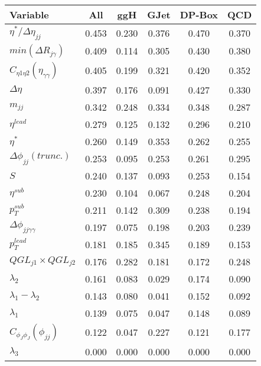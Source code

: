\documentclass[a4paper,portrait]{article}
\begin{document}
\begin{center}
\begin{tabular}{| l || c | c | c | c | c |}
\hline
Variable & All & ggH & GJet & DP-Box & QCD \\ \hline
\rowcolor{Salmon}
$\eta^{*}/\Delta\eta_{jj}$ & 0.453 & 0.230 & 0.376 & 0.470 & 0.370 \\ 
$min(\Delta{R}_{j\gamma})$ & 0.409 & 0.114 & 0.305 & 0.430 & 0.380 \\ 
\rowcolor{Salmon}
$C_{\eta1\eta2}(\eta_{\gamma\gamma})$ & 0.405 & 0.199 & 0.321 & 0.420 & 0.352 \\ 
$\Delta\eta$ & 0.397 & 0.176 & 0.091 & 0.427 & 0.330 \\ 
$m_{jj}$ & 0.342 & 0.248 & 0.334 & 0.348 & 0.287 \\ 
$\eta^{lead}$ & 0.279 & 0.125 & 0.132 & 0.296 & 0.210 \\ 
$\eta^{*}$ & 0.260 & 0.149 & 0.353 & 0.262 & 0.255 \\ 
$\Delta\phi_{jj}(trunc.)$ & 0.253 & 0.095 & 0.253 & 0.261 & 0.295 \\ 
\rowcolor{Salmon}
$S$ & 0.240 & 0.137 & 0.093 & 0.253 & 0.154 \\ 
$\eta^{sub}$ & 0.230 & 0.104 & 0.067 & 0.248 & 0.204 \\ 
$p_{T}^{sub}$ & 0.211 & 0.142 & 0.309 & 0.238 & 0.194 \\ 
$\Delta\phi_{jj\gamma\gamma}$ & 0.197 & 0.075 & 0.198 & 0.203 & 0.239 \\ 
$p_{T}^{lead}$ & 0.181 & 0.185 & 0.345 & 0.189 & 0.153 \\ 
$QGL_{j1}\times{QGL_{j2}}$ & 0.176 & 0.282 & 0.181 & 0.172 & 0.248 \\ 
\rowcolor{Salmon}
$\lambda_{2}$ & 0.161 & 0.083 & 0.029 & 0.174 & 0.090 \\ 
\rowcolor{Salmon}
$\lambda_{1}-\lambda_{2}$ & 0.143 & 0.080 & 0.041 & 0.152 & 0.092 \\ 
\rowcolor{Salmon}
$\lambda_{1}$ & 0.139 & 0.075 & 0.047 & 0.148 & 0.089 \\ 
\rowcolor{Salmon}
$C_{\phi_{J}\phi_{J}}(\phi_{jj})$ & 0.122 & 0.047 & 0.227 & 0.121 & 0.177 \\ 
\rowcolor{Salmon}
$\lambda_{3}$ & 0.000 & 0.000 & 0.000 & 0.000 & 0.000 \\ 
\hline
\end{tabular}
\end{center}
\end{document}
